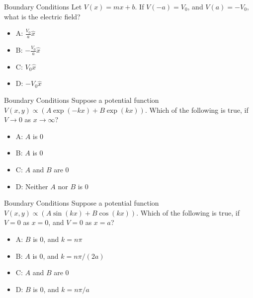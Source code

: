 \documentclass{beamer}
\begin{document}
\begin{frame}{Boundary Conditions}
Let $V(x) = m x + b$.  If $V(-a) = V_0$, and $V(a) = -V_0$, what is the electric field?
\begin{itemize}
\item A: $\frac{V_0}{a} \hat{x}$
\item B: $-\frac{V_0}{a} \hat{x}$
\item C: $V_0 \hat{x}$
\item D: $-V_0 \hat{x}$
\end{itemize}
\end{frame}

\begin{frame}{Boundary Conditions}
Suppose a potential function $V(x,y) \propto \left(A\exp(-kx) + B\exp(kx)\right)$.  Which of the following is true, if $V \to 0$ as $x \to \infty$?
\begin{itemize}
\item A: $A$ is 0
\item B: $A$ is 0
\item C: $A$ and $B$ are 0
\item D: Neither $A$ nor $B$ is 0
\end{itemize}
\end{frame}

\begin{frame}{Boundary Conditions}
Suppose a potential function $V(x,y) \propto \left(A\sin(kx) + B\cos(kx)\right)$.  Which of the following is true, if $V = 0$ as $x = 0$, and $V = 0$ as $x = a$?
\begin{itemize}
\item A: $B$ is 0, and $k = n\pi$
\item B: $A$ is 0, and $k = n\pi/(2a)$
\item C: $A$ and $B$ are 0
\item D: $B$ is 0, and $k = n\pi/a$
\end{itemize}
\end{frame}
\end{document}
